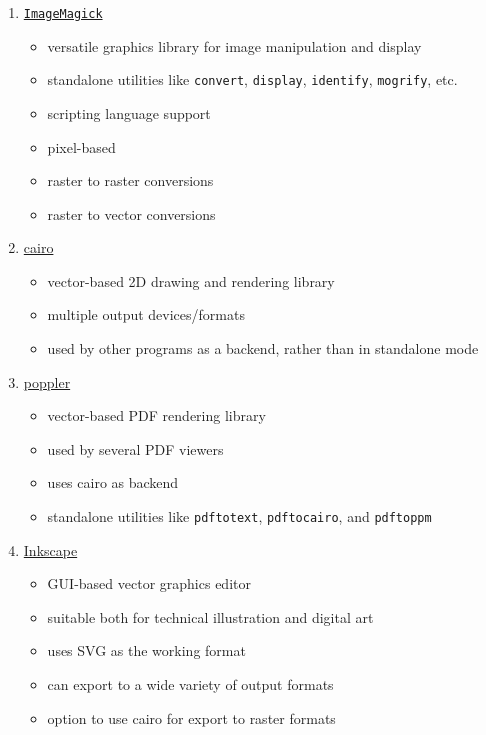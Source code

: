 \documentclass[
  11pt,
  british,
  a4paper,
]{article}
\providecommand{\tightlist}{%
  \setlength{\itemsep}{0pt}\setlength{\parskip}{0pt}}
\begin{document}
\begin{enumerate}
\tightlist
\item
  \href{https://imagemagick.org/index.php}{\texttt{ImageMagick}}

  \begin{itemize}
  \tightlist
  \item
    versatile graphics library for image manipulation and display
  \item
    standalone utilities like \texttt{convert}, \texttt{display},
    \texttt{identify}, \texttt{mogrify}, etc.
  \item
    scripting language support
  \item
    pixel-based
  \item
    raster to raster conversions
  \item
    raster to vector conversions
  \end{itemize}
\item
  \href{https://www.cairographics.org/}{cairo}

  \begin{itemize}
  \tightlist
  \item
    vector-based 2D drawing and rendering library
  \item
    multiple output devices/formats
  \item
    used by other programs as a backend, rather than in standalone mode
  \end{itemize}
\item
  \href{https://poppler.freedesktop.org/}{poppler}

  \begin{itemize}
  \tightlist
  \item
    vector-based PDF rendering library
  \item
    used by several PDF viewers
  \item
    uses cairo as backend
  \item
    standalone utilities like \texttt{pdftotext}, \texttt{pdftocairo},
    and \texttt{pdftoppm}
  \end{itemize}
\item
  \href{https://inkscape.org/}{Inkscape}

  \begin{itemize}
  \tightlist
  \item
    GUI-based vector graphics editor
  \item
    suitable both for technical illustration and digital art
  \item
    uses SVG as the working format
  \item
    can export to a wide variety of output formats
  \item
    option to use cairo for export to raster formats
  \end{itemize}
\end{enumerate}
\end{document}
